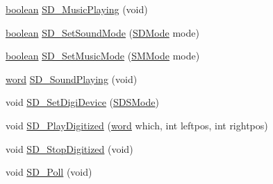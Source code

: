 \begin{DoxyCompactItemize}
\item 
\hyperlink{ID__HEAD_8H_a7c6368b321bd9acd0149b030bb8275ed}{boolean} \hyperlink{ID__SD_8H_aa097386a2a5ed395cef780871ba74a85}{SD\_\-MusicPlaying} (void)
\item 
\hyperlink{ID__HEAD_8H_a7c6368b321bd9acd0149b030bb8275ed}{boolean} \hyperlink{ID__SD_8H_a5150708f32ce380003f87fe23288859a}{SD\_\-SetSoundMode} (\hyperlink{ID__SD_8H_af66c128f54042fe02b7297e3e29a8b6d}{SDMode} mode)
\item 
\hyperlink{ID__HEAD_8H_a7c6368b321bd9acd0149b030bb8275ed}{boolean} \hyperlink{ID__SD_8H_ab12f4ca416e4aa16d877ac310f7a6792}{SD\_\-SetMusicMode} (\hyperlink{ID__SD_8H_ac43ff64e0d1da85aa6fee6723a38a4de}{SMMode} mode)
\item 
\hyperlink{ID__HEAD_8H_abad51e07ab6d26bec9f1f786c8d65bcd}{word} \hyperlink{ID__SD_8H_a32826e61458fce0f5667e3e1f4db95f4}{SD\_\-SoundPlaying} (void)
\item 
void \hyperlink{ID__SD_8H_af805d2a46f31efbb50c1d92347fd374d}{SD\_\-SetDigiDevice} (\hyperlink{ID__SD_8H_a5d22d74f0369393939a5d3cf1dcfdaf3}{SDSMode})
\item 
void \hyperlink{ID__SD_8H_a2807a99740c2e669483908fc03bda952}{SD\_\-PlayDigitized} (\hyperlink{ID__HEAD_8H_abad51e07ab6d26bec9f1f786c8d65bcd}{word} which, int leftpos, int rightpos)
\item 
void \hyperlink{ID__SD_8H_af508ee24c35bb22fae070def8e7c80ac}{SD\_\-StopDigitized} (void)
\item 
void \hyperlink{ID__SD_8H_a77ae2ddf3d133b4eadcca562a7d2c9d0}{SD\_\-Poll} (void)
\end{DoxyCompactItemize}
